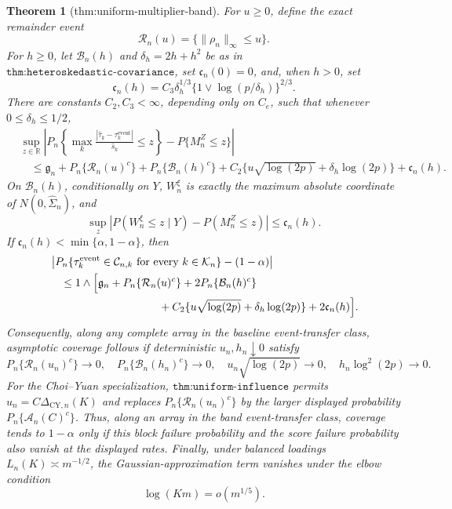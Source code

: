 \documentclass{article}
\newtheorem{theorem}{Theorem}
\begin{document}
\begin{theorem}[thm:uniform-multiplier-band]
For \(u\ge0\), define the exact remainder event
\[
 \mathcal R_n(u)=\{\|\rho_n\|_\infty\le u\}.
\]
For \(h\ge0\), let \(\mathcal B_n(h)\) and
\(\delta_h=2h+h^2\) be as in
\(\texttt{thm:heteroskedastic-covariance}\), set
\(\mathfrak c_n(0)=0\), and, when \(h>0\), set
\[
 \mathfrak c_n(h)=C_3\delta_h^{1/3}
 \{1\vee\log(p/\delta_h)\}^{2/3}.
\]
There are constants \(C_2,C_3<\infty\), depending only on \(C_e\),
such that whenever \(0\le\delta_h\le1/2\),
\[
 \begin{aligned}
 &\sup_{z\in\mathbb R}\left|P_n\!\left\{
 \max_k\frac{|\widehat\tau_k-\tau_k^{\mathrm{event}}|}{\widehat s_k}
 \le z\right\}-P\{M_n^Z\le z\}\right|\\
 &\quad\le \mathfrak g_n+P_n\{\mathcal R_n(u)^c\}
 +P_n\{\mathcal B_n(h)^c\}
 +C_2\{u\sqrt{\log(2p)}+\delta_h\log(2p)\}
 +\mathfrak c_n(h).
 \end{aligned}
\]
On \(\mathcal B_n(h)\), conditionally on \(Y\), \(W_n^\xi\) is
exactly the maximum absolute coordinate of
\(N(0,\widehat\Sigma_n)\), and
\[
 \sup_z|P(W_n^\xi\le z\mid Y)-P(M_n^Z\le z)|
 \le\mathfrak c_n(h).
\]
If \(\mathfrak c_n(h)<\min\{\alpha,1-\alpha\}\), then
\[
 \begin{aligned}
 &\left|P_n\{\tau_k^{\mathrm{event}}\in\mathcal C_{n,k}
 \text{ for every }k\in\mathcal K_n\}-(1-\alpha)\right|\\
 &\quad\le1\wedge\Big[\mathfrak g_n
 +P_n\{\mathcal R_n(u)^c\}+2P_n\{\mathcal B_n(h)^c\}\\
 &\hspace{35mm}+C_2\{u\sqrt{\log(2p)}+\delta_h\log(2p)\}
 +2\mathfrak c_n(h)\Big].
 \end{aligned}
\]
Consequently, along any complete array in the baseline event-transfer
class, asymptotic coverage follows if deterministic \(u_n,h_n\downarrow0\)
satisfy
\[
 P_n\{\mathcal R_n(u_n)^c\}\to0,
 \quad P_n\{\mathcal B_n(h_n)^c\}\to0,
 \quad u_n\sqrt{\log(2p)}\to0,
 \quad h_n\log^2(2p)\to0.
\]
For the Choi--Yuan specialization,
\(\texttt{thm:uniform-influence}\) permits
\(u_n=C\Delta_{\mathrm{CY},n}(K)\) and replaces
\(P_n\{\mathcal R_n(u_n)^c\}\) by the larger displayed probability
\(P_n\{\mathcal A_n(C)^c\}\).  Thus, along an array in the band
event-transfer class, coverage tends to \(1-\alpha\) only if this block
failure probability and the score failure probability also vanish at the
displayed rates.  Finally, under balanced loadings
\(L_n(K)\asymp m^{-1/2}\), the Gaussian-approximation term vanishes under
the elbow condition
\[
 \log(Km)=o(m^{1/5}).
\]
\end{theorem}
\end{document}
